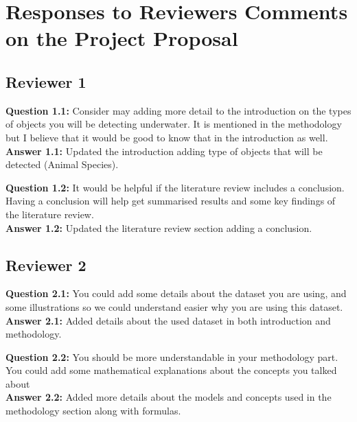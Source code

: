 \appendix

\section{Responses to Reviewers Comments on the Project Proposal}

\vspace{1em}

\subsection{Reviewer 1}

\textbf{Question 1.1:} Consider may adding more detail to the introduction on the types of objects you will be detecting underwater. It is mentioned in the methodology but I believe that it would be good to know that in the introduction as well.\\
\textbf{Answer 1.1:} Updated the introduction adding type of objects that will be detected (Animal Species).

\vspace{1em}

\textbf{Question 1.2:} It would be helpful if the literature review includes a conclusion. Having a conclusion will help get summarised results and some key findings of the literature review.\\
\textbf{Answer 1.2:} Updated the literature review section adding a conclusion.

\vspace{1em}

\subsection{Reviewer 2}

\textbf{Question 2.1:} You could add some details about the dataset you are using, and some illustrations so we could understand easier why you are using this dataset.\\
\textbf{Answer 2.1:} Added details about the used dataset in both introduction and methodology.

\vspace{1em}

\textbf{Question 2.2:} You should be more understandable in your methodology part. You could add some mathematical explanations about the concepts you talked about\\
\textbf{Answer 2.2:} Added more details about the models and concepts used in the methodology section along with formulas.

